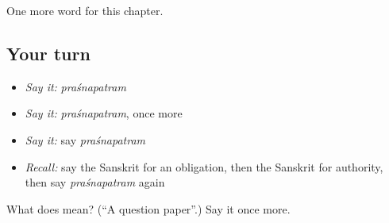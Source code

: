 \begin{grammarlens}[title={What you've built}]
One more word for this chapter.
\end{grammarlens}

\subsection*{Your turn}
\begin{itemize}
\raggedright
  \item \emph{Say it:} \emph{praśnapatram}
  \item \emph{Say it:} \emph{praśnapatram}, once more
  \item \emph{Say it:} say \emph{praśnapatram}
  \item \emph{Recall:} say the Sanskrit for an obligation, then the Sanskrit for authority, then say \emph{praśnapatram} again
\end{itemize}

\begin{tcolorbox}[breakable,colback=teal!4,colframe=teal!35!black,title={Before you move on}]
What does  mean? (\textquotedblleft{}A question paper\textquotedblright{}.) Say it once more.
\end{tcolorbox}
